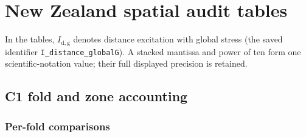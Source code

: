 \section{New Zealand spatial audit tables}

In the tables, $I_{\mathrm{d,g}}$ denotes distance excitation with global stress (the saved identifier \texttt{I\_distance\_globalG}). A stacked mantissa and power of ten form one scientific-notation value; their full displayed precision is retained.
\label{app:audit10}

\subsection{C1 fold and zone accounting}
\label{app:audit10-c1}

\subsubsection{Per-fold comparisons}

